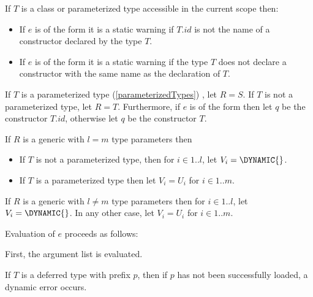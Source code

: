 \documentclass{article}
\begin{document}


\LMHash{}
If $T$ is a class or parameterized type accessible in the current scope then:
\begin{itemize}
\item
If $e$ is of the form
it is a static warning if $T.id$ is not the name of a constructor declared by the type $T$.
\item
If $e$ is of the form
it is a static warning if the type $T$ does not declare a constructor with the same name as the declaration of $T$.
\end{itemize}

\LMHash{}
If $T$ is a parameterized type (\ref{parameterizedTypes})
,
let $R = S$.
If $T$ is not a parameterized type, let $R = T$.
Furthermore, if $e$ is of the form
then let $q$ be the constructor $T.id$, otherwise let $q$ be the constructor $T$.

\LMHash{}
If $R$ is a generic with $l = m$ type parameters then
\begin{itemize}
\item If $T$ is not a parameterized type, then for $ i \in 1 .. l$, let $V_i = \DYNAMIC{}$.
\item If $T$ is a parameterized type then let $V_i = U_i$ for $ i \in 1 .. m$.
\end{itemize}

\LMHash{}
If $R$ is a generic with $l \ne m$ type parameters then for $ i \in 1 .. l$, let $V_i = \DYNAMIC{}$.
In any other case, let $V_i = U_i$ for $ i \in 1 .. m$.

\LMHash{}
Evaluation of $e$ proceeds as follows:

\LMHash{}
First, the argument list
is evaluated.

\LMHash{}
If $T$ is a deferred type with prefix $p$, then if $p$ has not been successfully loaded, a dynamic error occurs.
\end{document}
